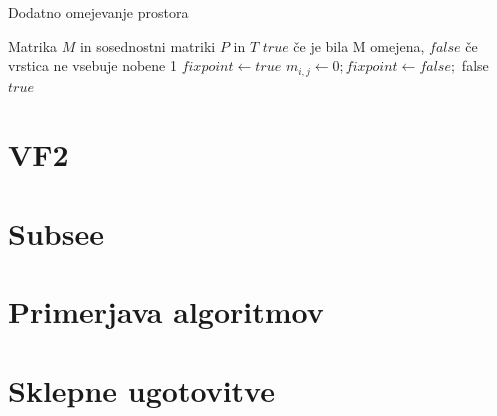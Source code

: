 \documentclass[a4paper, 12pt, ]{book}
\begin{document}
\begin{algorithm}
\caption{Dodatno omejevanje prostora}
\label{alg:ullmann2}
\begin{algorithmic}[1]
	\Require Matrika $M$ in sosednostni matriki $P$ in $T$
	\Ensure $true$ če je bila M omejena, $false$ če vrstica ne vsebuje nobene 1
		\State $fixpoint \gets true$
		\Repeat
					\State $m_{i,j} \gets 0; fixpoint \gets false;$
						\State \Return false
					\EndIf
				\EndIf
			\EndFor
		\State \Return $true$
	\EndFunction
\end{algorithmic}
\end{algorithm}

\chapter{VF2}

\chapter{Subsee}

\chapter{Primerjava algoritmov}
	\section{}

\chapter{Sklepne ugotovitve}
\end{document}

